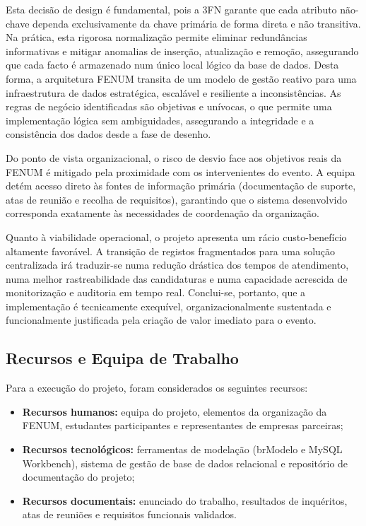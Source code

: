 \documentclass[12pt,a4paper]{article}
\begin{document}
Esta decisão de design é fundamental, pois a 3FN garante que cada atributo não-chave dependa exclusivamente da chave primária de forma direta e não transitiva. Na prática, esta rigorosa normalização permite eliminar redundâncias informativas e mitigar anomalias de inserção, atualização e remoção, assegurando que cada facto é armazenado num único local lógico da base de dados. Desta forma, a arquitetura FENUM transita de um modelo de gestão reativo para uma infraestrutura de dados estratégica, escalável e resiliente a inconsistências. As regras de negócio identificadas são objetivas e unívocas,
o que permite uma implementação lógica sem ambiguidades, assegurando a
integridade e a consistência dos dados desde a fase de desenho.

Do ponto de vista organizacional, o risco de desvio face aos objetivos reais da
FENUM é mitigado pela proximidade com os intervenientes do evento. A equipa
detém acesso direto às fontes de informação primária (documentação de suporte,
atas de reunião e recolha de requisitos), garantindo que o sistema desenvolvido
corresponda exatamente às necessidades de coordenação da organização.

Quanto à viabilidade operacional, o projeto apresenta um rácio custo-benefício
altamente favorável. A transição de registos fragmentados para uma solução
centralizada irá traduzir-se numa redução drástica dos tempos de atendimento,
numa melhor rastreabilidade das candidaturas e numa capacidade acrescida de
monitorização e auditoria em tempo real. Conclui-se, portanto, que a
implementação é tecnicamente exequível, organizacionalmente sustentada e
funcionalmente justificada pela criação de valor imediato para o evento.

\subsection{Recursos e Equipa de Trabalho}

Para a execução do projeto, foram considerados os seguintes recursos:

\begin{itemize}[leftmargin=1.5cm]
    \item \textbf{Recursos humanos:} equipa do projeto, elementos da organização
    da FENUM, estudantes participantes e representantes de empresas parceiras;
    \item \textbf{Recursos tecnológicos:} ferramentas de modelação (brModelo e
    MySQL Workbench), sistema de gestão de base de dados relacional e
    repositório de documentação do projeto;
    \item \textbf{Recursos documentais:} enunciado do trabalho, resultados de
    inquéritos, atas de reuniões e requisitos funcionais validados.
\end{itemize}
\end{document}
